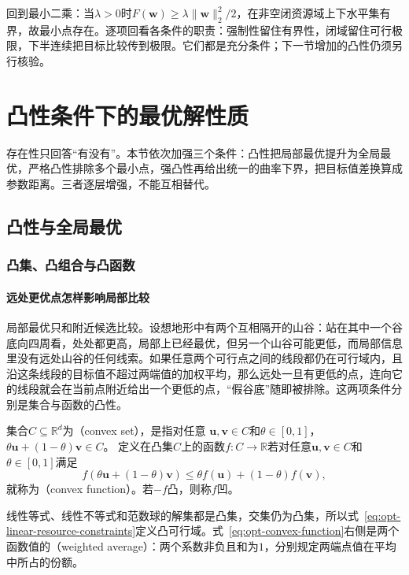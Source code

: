 \noindent\begin{minipage}{\linewidth}
回到最小二乘：当$\lambda>0$时$F(\bm w)\geq\lambda\lVert\bm w\rVert_2^2/2$，在非空闭资源域上下水平集有界，故最小点存在。逐项回看各条件的职责：强制性留住有界性，闭域留住可行极限，下半连续把目标比较传到极限。它们都是充分条件；下一节增加的凸性仍须另行核验。

\section{凸性条件下的最优解性质}
\label{sec:opt-convexity}

存在性只回答“有没有”。本节依次加强三个条件：凸性把局部最优提升为全局最优，严格凸性排除多个最小点，强凸性再给出统一的曲率下界，把目标值差换算成参数距离。三者逐层增强，不能互相替代。

\subsection{凸性与全局最优}

\subsubsection{凸集、凸组合与凸函数}

\paragraph{远处更优点怎样影响局部比较}

局部最优只和附近候选比较。设想地形中有两个互相隔开的山谷：站在其中一个谷底向四周看，处处都更高，局部上已经最优，但另一个山谷可能更低，而局部信息里没有远处山谷的任何线索。如果任意两个可行点之间的线段都仍在可行域内，且沿这条线段的目标值不超过两端值的加权平均，那么远处一旦有更低的点，连向它的线段就会在当前点附近给出一个更低的点，“假谷底”随即被排除。这两项条件分别是集合与函数的凸性。
\end{minipage}\par
\begin{definition}[凸集与凸函数]
\label{def:opt-convex-set-function}
集合$C\subseteq\mathbb R^d$为（convex set），是指对任意
$\bm{u},\bm{v}\in C$和$\theta\in[0,1]$，
$\theta\bm{u}+(1-\theta)\bm{v}\in C$。
定义在凸集$C$上的函数$f:C\to\mathbb R$若对任意$\bm u,\bm v\in C$和$\theta\in[0,1]$满足
\begin{equation}
  f(\theta\bm{u}+(1-\theta)\bm{v})
  \leq
  \theta f(\bm{u})+(1-\theta)f(\bm{v}),
  \label{eq:opt-convex-function}
\end{equation}
就称为（convex function）。若$-f$凸，则称$f$凹。
\end{definition}
线性等式、线性不等式和范数球的解集都是凸集，交集仍为凸集，所以式~\eqref{eq:opt-linear-resource-constraints}定义凸可行域。式~\eqref{eq:opt-convex-function}右侧是两个函数值的（weighted average）：两个系数非负且和为$1$，分别规定两端点值在平均中所占的份额。

